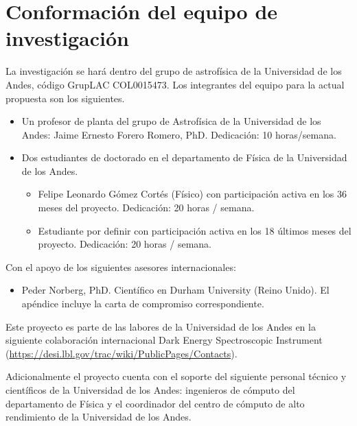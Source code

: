 \section{Conformaci\'on del equipo de investigaci\'on}

La investigaci\'on se har\'a dentro del grupo de astrof\'isica de la
Universidad de los Andes, c\'odigo GrupLAC COL0015473. 
Los integrantes del equipo para la actual propuesta son los
siguientes.  


\begin{itemize}
\item Un profesor de planta del grupo de Astrof\'isica de la
  Universidad de los Andes: Jaime Ernesto  Forero Romero, PhD.
  Dedicaci\'on: 10 horas/semana.
\item Dos estudiantes de doctorado en el departamento de F\'isica de
  la Universidad de los Andes.
\begin{itemize}
\item Felipe Leonardo G\'omez Cort\'es (F\'isico) con participaci\'on
  activa en los 36 meses del proyecto. Dedicaci\'on: 20 horas /
  semana.   
\item Estudiante por definir con participaci\'on activa en los 18 \'ultimos
  meses del proyecto. Dedicaci\'on: 20 horas / semana.  
\end{itemize}
\end{itemize}

\noindent

Con el apoyo de los siguientes asesores internacionales:

\begin{itemize}
\item Peder Norberg, PhD. Cient\'ifico en Durham University (Reino
  Unido). El ap\'endice incluye la carta de compromiso
  correspondiente. 
\end{itemize}

Este proyecto es parte de las labores de la Universidad de los Andes
en la siguiente colaboraci\'on internacional Dark Energy Spectroscopic
Instrument (\url{https://desi.lbl.gov/trac/wiki/PublicPages/Contacts}). 

\noindent
Adicionalmente el proyecto cuenta con el soporte del siguiente
personal t\'ecnico y cient\'ificos de la Universidad de los Andes: ingenieros de c\'omputo del departamento de F\'isica y el coordinador del centro de c\'omputo de alto rendimiento de la Universidad de los Andes.

